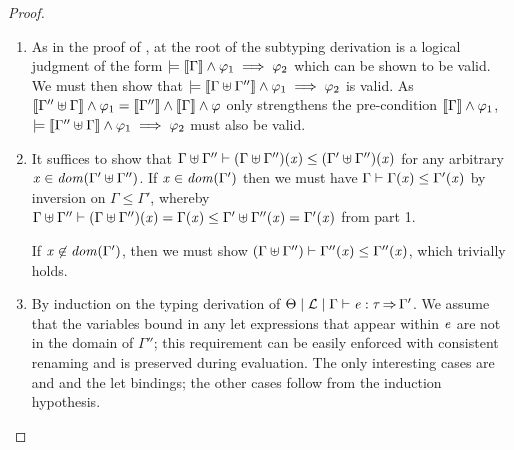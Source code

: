 \begin{proof}
  \leavevmode
  \begin{enumerate}
  \item As in the proof of , at the root of
    the subtyping derivation is a logical judgment of the form
    $\models   \left\llbracket{ \Gamma }\right\rrbracket   \wedge  \varphi_{{\mathrm{1}}}  \implies  \varphi_{{\mathrm{2}}}$ which can be shown to be valid. We
    must then show that $\models   \left\llbracket{  \Gamma  \uplus  \Gamma''  }\right\rrbracket   \wedge  \varphi_{{\mathrm{1}}}  \implies  \varphi_{{\mathrm{2}}}$ is valid. As
    $ \left\llbracket{  \Gamma''  \uplus  \Gamma  }\right\rrbracket   \wedge  \varphi_{{\mathrm{1}}}  =   \left\llbracket{ \Gamma'' }\right\rrbracket   \wedge   \left\llbracket{ \Gamma }\right\rrbracket   \wedge  \varphi$ only strengthens the pre-condition
    $ \left\llbracket{ \Gamma }\right\rrbracket   \wedge  \varphi_{{\mathrm{1}}}$, $\models   \left\llbracket{  \Gamma''  \uplus  \Gamma  }\right\rrbracket   \wedge  \varphi_{{\mathrm{1}}}  \implies  \varphi_{{\mathrm{2}}}$ must
    also be valid.
  \item It suffices to show that $ \Gamma  \uplus  \Gamma''   \vdash  (   \Gamma  \uplus  \Gamma''   )  (  \mathit{x}  )  \leq  (   \Gamma'  \uplus  \Gamma''   )  (  \mathit{x}  )$ for
    any arbitrary $ \mathit{x}  \in   \mathit{dom}(  \Gamma'  \uplus  \Gamma''  )  $. If $ \mathit{x}  \in \mathit{dom}( \Gamma' ) $ then we must have
    $\Gamma  \vdash  \Gamma  (  \mathit{x}  )  \leq  \Gamma'  (  \mathit{x}  )$ by inversion on $\Gamma  \leq  \Gamma'$,
    whereby $ \Gamma  \uplus  \Gamma''   \vdash  (   \Gamma  \uplus  \Gamma''   )  (  \mathit{x}  )  =  \Gamma  (  \mathit{x}  )  \leq   \Gamma'  \uplus  \Gamma''   (  \mathit{x}  )  =  \Gamma'  (  \mathit{x}  )$ from part 1.

    If $ \mathit{x}  \not\in \mathit{dom}( \Gamma' ) $, then we must show $(   \Gamma  \uplus  \Gamma''   )  \vdash  \Gamma''  (  \mathit{x}  )  \leq  \Gamma''  (  \mathit{x}  )$, which trivially holds.
  \item By induction on the typing derivation of
    $ \Theta   \mid   \mathcal{L}   \mid   \Gamma   \vdash   \mathit{e}  :  \tau   \operatorname{\Rightarrow}   \Gamma' $. We assume that the variables bound in
    any let expressions that appear within $\mathit{e}$ are not in the domain
    of $\Gamma''$; this requirement can be easily enforced with
    consistent renaming and is preserved during evaluation. The only interesting cases are
     and  and the let bindings;
    the other cases follow from the induction hypothesis.
    

\end{enumerate}
\end{proof}
